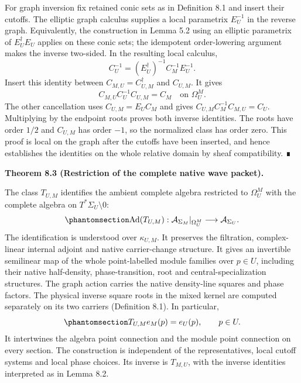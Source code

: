 \documentclass[
  english,
  11pt,
  reqno]{amsart}
\makeatletter
\newcommand{\pandocstatementheading}[1]{%
  \par\addpenalty{\@beginparpenalty}%
  \addvspace{.5\baselineskip plus .2\baselineskip minus .2\baselineskip}%
  {\normalfont\bfseries #1\par}%
  \nobreak\@afterindenttrue\@afterheading
}
\makeatother
\begin{document}
For graph inversion fix retained conic sets as in Definition 8.1 and
insert their cutoffs. The elliptic graph calculus supplies a local
parametrix \(E_U^{-1}\) in the reverse graph. Equivalently, the
construction in Lemma 5.2 using an elliptic parametrix of
\(E_U^{\dagger}E_U\) applies on these conic sets; the idempotent
order-lowering argument makes the inverse two-sided. In the resulting
local calculus, \[
C_U^{-1}
=(E_U^{\dagger})^{-1}C_M^{-1}E_U^{-1}.
\] Insert this identity between \(C_{M,U}=C_{U,M}^{\dagger}\) and
\(C_{U,M}\). It gives \[
C_{M,U}C_U^{-1}C_{U,M}=C_M
\quad\text{on }\Omega_U^M.
\] The other cancellation uses \(C_{U,M}=E_UC_M\) and gives
\(C_{U,M}C_M^{-1}C_{M,U}=C_U\). Multiplying by the endpoint roots proves
both inverse identities. The roots have order \(1/2\) and \(C_{U,M}\)
has order \(-1\), so the normalized class has order zero. This proof is
local on the graph after the cutoffs have been inserted, and hence
establishes the identities on the whole relative domain by sheaf
compatibility. ∎

\pandocstatementheading{\protect{}\label{thm:relative-wave-packet-comparison}Theorem 8.3 (Restriction of the complete native wave packet).}

The class \(T_{U,M}\) identifies the ambient complete algebra restricted
to \(\Omega_U^M\) with the complete algebra on
\(T^*\Sigma_U\setminus0\):
\begin{equation}\protect\phantomsection\label{eq:relative-algebra-comparison}{
\operatorname{Ad}(T_{U,M}):
\mathcal A_{\Sigma_M}|_{\Omega_U^M}
\longrightarrow \mathcal A_{\Sigma_U}.
}\end{equation} The identification is understood over \(\kappa_{U,M}\).
It preserves the filtration, complex-linear internal adjoint and native
carrier-change structure. It gives an invertible semilinear map of the
whole point-labelled module families over \(p\in U\), including their
native half-density, phase-transition, root and central-specialization
structures. The graph action carries the native density-line squares and
phase factors. The physical inverse square roots in the mixed kernel are
computed separately on its two carriers (Definition 8.1). In particular,
\begin{equation}\protect\phantomsection\label{eq:relative-full-evaluation}{
T_{U,M}e_M(p)=e_U(p),\qquad p\in U.
}\end{equation} It intertwines the algebra point connection and the
module point connection on every section. The construction is
independent of the representatives, local cutoff systems and local phase
choices. Its inverse is \(T_{M,U}\), with the inverse identities
interpreted as in Lemma 8.2.
\end{document}
